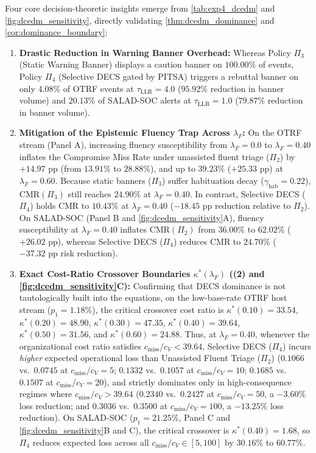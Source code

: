 \documentclass[11pt,a4paper]{article}
\begin{document}
Four core decision-theoretic insights emerge from \cref{tab:exp4_dcedm} and \cref{fig:dcedm_sensitivity}, directly validating \cref{thm:dcedm_dominance} and \cref{cor:dominance_boundary}:
\begin{enumerate}
  \item \textbf{Drastic Reduction in Warning Banner Overhead:} Whereas Policy $\Pi_3$ (Static Warning Banner) displays a caution banner on $100.00\%$ of events, Policy $\Pi_4$ (Selective DECS gated by PITSA) triggers a rebuttal banner on only $4.08\%$ of OTRF events at $\tau_{\text{LLR}} = 4.0$ ($95.92\%$ reduction in banner volume) and $20.13\%$ of SALAD-SOC alerts at $\tau_{\text{LLR}} = 1.0$ ($79.87\%$ reduction in banner volume).
  \item \textbf{Mitigation of the Epistemic Fluency Trap Across $\lambda_F$:} On the OTRF stream (Panel A), increasing fluency susceptibility from $\lambda_F = 0.0$ to $\lambda_F = 0.40$ inflates the Compromise Miss Rate under unassisted fluent triage ($\Pi_2$) by $+14.97\text{ pp}$ (from $13.91\%$ to $28.88\%$), and up to $39.23\%$ ($+25.33\text{ pp}$) at $\lambda_F = 0.60$. Because static banners ($\Pi_3$) suffer habituation decay ($\gamma_{\text{hab}} = 0.22$), $\text{CMR}(\Pi_3)$ still reaches $24.90\%$ at $\lambda_F = 0.40$. In contrast, Selective DECS ($\Pi_4$) holds $\text{CMR}$ to $10.43\%$ at $\lambda_F = 0.40$ ($-18.45\text{ pp}$ reduction relative to $\Pi_2$). On SALAD-SOC (Panel B and \cref{fig:dcedm_sensitivity}A), fluency susceptibility at $\lambda_F = 0.40$ inflates $\text{CMR}(\Pi_2)$ from $36.00\%$ to $62.02\%$ ($+26.02\text{ pp}$), whereas Selective DECS ($\Pi_4$) reduces $\text{CMR}$ to $24.70\%$ ($-37.32\text{ pp}$ risk reduction).
  \item \textbf{Exact Cost-Ratio Crossover Boundaries $\kappa^*(\lambda_F)$ ((2) and \cref{fig:dcedm_sensitivity}C):} Confirming that DECS dominance is not tautologically built into the equations, on the low-base-rate OTRF host stream ($p_1 = 1.18\%$), the critical crossover cost ratio is $\kappa^*(0.10) = 33.54$, $\kappa^*(0.20) = 48.90$, $\kappa^*(0.30) = 47.35$, $\kappa^*(0.40) = 39.64$, $\kappa^*(0.50) = 31.56$, and $\kappa^*(0.60) = 24.88$. Thus, at $\lambda_F = 0.40$, whenever the organizational cost ratio satisfies $c_{\text{miss}}/c_V < 39.64$, Selective DECS ($\Pi_4$) incurs \emph{higher} expected operational loss than Unassisted Fluent Triage ($\Pi_2$) ($0.1066$ vs.\ $0.0745$ at $c_{\text{miss}}/c_V = 5$; $0.1332$ vs.\ $0.1057$ at $c_{\text{miss}}/c_V = 10$; $0.1685$ vs.\ $0.1507$ at $c_{\text{miss}}/c_V = 20$), and strictly dominates only in high-consequence regimes where $c_{\text{miss}}/c_V > 39.64$ ($0.2340$ vs.\ $0.2427$ at $c_{\text{miss}}/c_V = 50$, a $-3.60\%$ loss reduction; and $0.3036$ vs.\ $0.3500$ at $c_{\text{miss}}/c_V = 100$, a $-13.25\%$ loss reduction). On SALAD-SOC ($p_1 = 21.25\%$, Panel C and \cref{fig:dcedm_sensitivity}B and C), the critical crossover is $\kappa^*(0.40) = 1.68$, so $\Pi_4$ reduces expected loss across all $c_{\text{miss}}/c_V \in [5, 100]$ by $30.16\%$ to $60.77\%$.

\end{enumerate}
\end{document}
